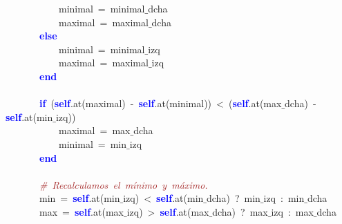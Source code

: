 \mbox{}\ \ \ \ \ \ \ \ \ \ \ \ minimal\ \textcolor{BrickRed}{=}\ minimal$\_$dcha \\
\mbox{}\ \ \ \ \ \ \ \ \ \ \ \ maximal\ \textcolor{BrickRed}{=}\ maximal$\_$dcha \\
\mbox{}\ \ \ \ \ \ \ \ \textbf{\textcolor{Blue}{else}}\  \\
\mbox{}\ \ \ \ \ \ \ \ \ \ \ \ minimal\ \textcolor{BrickRed}{=}\ minimal$\_$izq \\
\mbox{}\ \ \ \ \ \ \ \ \ \ \ \ maximal\ \textcolor{BrickRed}{=}\ maximal$\_$izq \\
\mbox{}\ \ \ \ \ \ \ \ \textbf{\textcolor{Blue}{end}}\  \\
\mbox{} \\
\mbox{}\ \ \ \ \ \ \ \ \textbf{\textcolor{Blue}{if}}\ \textcolor{BrickRed}{(}\textbf{\textcolor{Blue}{self}}\textcolor{BrickRed}{.}at\textcolor{BrickRed}{(}maximal\textcolor{BrickRed}{)}\ \textcolor{BrickRed}{-}\ \textbf{\textcolor{Blue}{self}}\textcolor{BrickRed}{.}at\textcolor{BrickRed}{(}minimal\textcolor{BrickRed}{))}\ \textcolor{BrickRed}{\textless{}}\ \textcolor{BrickRed}{(}\textbf{\textcolor{Blue}{self}}\textcolor{BrickRed}{.}at\textcolor{BrickRed}{(}max$\_$dcha\textcolor{BrickRed}{)}\ \textcolor{BrickRed}{-}\ \textbf{\textcolor{Blue}{self}}\textcolor{BrickRed}{.}at\textcolor{BrickRed}{(}min$\_$izq\textcolor{BrickRed}{))} \\
\mbox{}\ \ \ \ \ \ \ \ \ \ \ \ maximal\ \textcolor{BrickRed}{=}\ max$\_$dcha \\
\mbox{}\ \ \ \ \ \ \ \ \ \ \ \ minimal\ \textcolor{BrickRed}{=}\ min$\_$izq \\
\mbox{}\ \ \ \ \ \ \ \ \textbf{\textcolor{Blue}{end}} \\
\mbox{}\ \ \ \ \ \ \ \  \\
\mbox{}\ \ \ \ \ \ \ \ \textit{\textcolor{Brown}{\#\ Recalculamos\ el\ mínimo\ y\ máximo.\ \ }} \\
\mbox{}\ \ \ \ \ \ \ \ min\ \textcolor{BrickRed}{=}\ \textbf{\textcolor{Blue}{self}}\textcolor{BrickRed}{.}at\textcolor{BrickRed}{(}min$\_$izq\textcolor{BrickRed}{)}\ \textcolor{BrickRed}{\textless{}}\ \textbf{\textcolor{Blue}{self}}\textcolor{BrickRed}{.}at\textcolor{BrickRed}{(}min$\_$dcha\textcolor{BrickRed}{)}\ \textcolor{BrickRed}{?}\ min$\_$izq\ \textcolor{BrickRed}{:}\ min$\_$dcha \\
\mbox{}\ \ \ \ \ \ \ \ max\ \textcolor{BrickRed}{=}\ \textbf{\textcolor{Blue}{self}}\textcolor{BrickRed}{.}at\textcolor{BrickRed}{(}max$\_$izq\textcolor{BrickRed}{)}\ \textcolor{BrickRed}{\textgreater{}}\ \textbf{\textcolor{Blue}{self}}\textcolor{BrickRed}{.}at\textcolor{BrickRed}{(}max$\_$dcha\textcolor{BrickRed}{)}\ \textcolor{BrickRed}{?}\ max$\_$izq\ \textcolor{BrickRed}{:}\ max$\_$dcha \\

